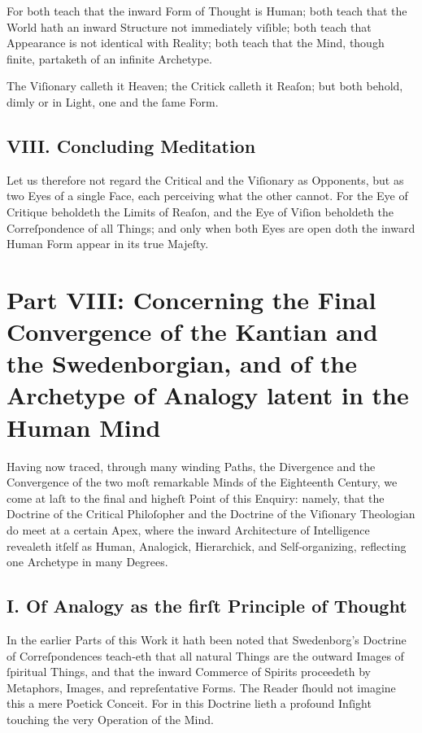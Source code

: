\documentclass[12pt]{article}
\begin{document}
For both teach that the inward Form of Thought is Human; both teach that the 
World hath an inward Structure not immediately viſible; both teach that 
Appearance is not identical with Reality; both teach that the Mind, though 
finite, partaketh of an infinite Archetype.

The Viſionary calleth it Heaven; the Critick calleth it Reaſon; but both 
behold, dimly or in Light, one and the ſame Form.

\subsection*{VIII. Concluding Meditation}

Let us therefore not regard the Critical and the Viſionary as Opponents, but 
as two Eyes of a single Face, each perceiving what the other cannot. For the 
Eye of Critique beholdeth the Limits of Reaſon, and the Eye of Viſion 
beholdeth the Correſpondence of all Things; and only when both Eyes are open 
doth the inward Human Form appear in its true Majeſty.

\newpage

\section*{Part VIII: Concerning the Final Convergence of the Kantian and the Swedenborgian, and of the Archetype of Analogy latent in the Human Mind}

Having now traced, through many winding Paths, the Divergence and the 
Convergence of the two moſt remarkable Minds of the Eighteenth Century, we 
come at laſt to the final and higheſt Point of this Enquiry: namely, that the 
Doctrine of the Critical Philoſopher and the Doctrine of the Viſionary 
Theologian do meet at a certain Apex, where the inward Architecture of 
Intelligence revealeth itſelf as Human, Analogick, Hierarchick, and 
Self-organizing, reflecting one Archetype in many Degrees.

\subsection*{I. Of Analogy as the firſt Principle of Thought}

In the earlier Parts of this Work it hath been noted that Swedenborg’s 
Doctrine of Correſpondences teach-eth that all natural Things are the outward 
Images of ſpiritual Things, and that the inward Commerce of Spirits proceedeth 
by Metaphors, Images, and repreſentative Forms. The Reader ſhould not imagine 
this a mere Poetick Conceit. For in this Doctrine lieth a profound Inſight 
touching the very Operation of the Mind.
\end{document}
